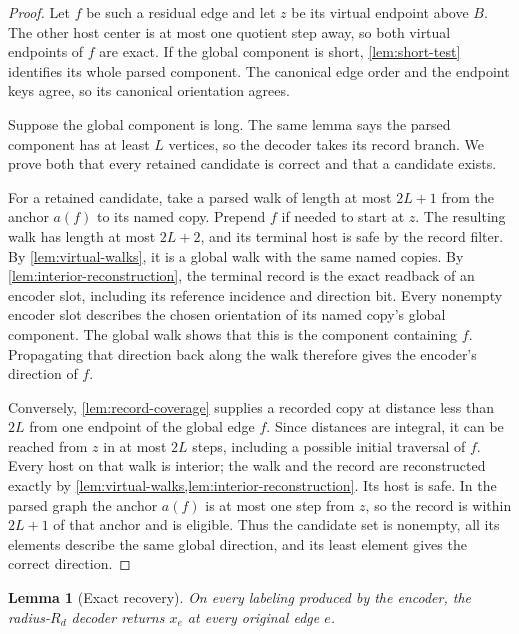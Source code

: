 \documentclass[11pt]{article}
\newtheorem{lemma}[theorem]{Lemma}
\theoremstyle{definition}
\theoremstyle{remark}
\begin{document}
\begin{proof}
Let $f$ be such a residual edge and let $z$ be its virtual endpoint above
$B$.  The other host center is at most one quotient step away, so both
virtual endpoints of $f$ are exact.  If the global component is short,
\cref{lem:short-test} identifies its whole parsed component.  The
canonical edge order and the endpoint keys agree, so its canonical
orientation agrees.

Suppose the global component is long.  The same lemma says the parsed
component has at least $L$ vertices, so the decoder takes its record
branch.  We prove both that every retained candidate is correct and
that a candidate exists.

For a retained candidate, take a parsed walk of length at most $2L+1$
from the anchor $a(f)$ to its named copy.  Prepend $f$ if needed to
start at $z$.  The resulting walk has length at most $2L+2$, and its
terminal host is safe by the record filter.  By
\cref{lem:virtual-walks}, it is a global walk with the same named copies.
By \cref{lem:interior-reconstruction}, the terminal record is the exact
readback of an encoder slot, including its reference incidence and
direction bit.  Every nonempty encoder slot describes the chosen
orientation of its named copy's global component.  The global walk shows
that this is the component containing $f$.  Propagating that direction
back along the walk therefore gives the encoder's direction of $f$.

Conversely, \cref{lem:record-coverage} supplies a recorded copy at distance
less than $2L$ from one endpoint of the global edge $f$.  Since distances
are integral, it can be reached from $z$ in at most $2L$ steps, including
a possible initial traversal of $f$.  Every host on that walk is interior;
the walk and the record are reconstructed exactly by
\cref{lem:virtual-walks,lem:interior-reconstruction}.  Its host is safe.
In the parsed graph the anchor $a(f)$ is at most one step from $z$,
so the record is within $2L+1$ of that anchor and is eligible.  Thus the
candidate set is nonempty, all its elements describe the same global
direction, and its least element gives the correct direction.
\end{proof}

\begin{lemma}[Exact recovery]
\label{lem:exact-recovery}
On every labeling produced by the encoder, the radius-$R_d$ decoder
returns $x_e$ at every original edge $e$.
\end{lemma}
\end{document}
